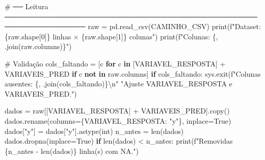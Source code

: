 \documentclass[
  letterpaper,
  DIV=11,
  numbers=noendperiod]{scrartcl}
\newenvironment{Shaded}{\begin{snugshade}}{\end{snugshade}}
\newcommand{\BuiltInTok}[1]{\textcolor[rgb]{0.00,0.23,0.31}{#1}}
\newcommand{\CharTok}[1]{\textcolor[rgb]{0.13,0.47,0.30}{#1}}
\newcommand{\CommentTok}[1]{\textcolor[rgb]{0.37,0.37,0.37}{#1}}
\newcommand{\ControlFlowTok}[1]{\textcolor[rgb]{0.00,0.23,0.31}{\textbf{#1}}}
\newcommand{\DecValTok}[1]{\textcolor[rgb]{0.68,0.00,0.00}{#1}}
\newcommand{\KeywordTok}[1]{\textcolor[rgb]{0.00,0.23,0.31}{\textbf{#1}}}
\newcommand{\NormalTok}[1]{\textcolor[rgb]{0.00,0.23,0.31}{#1}}
\newcommand{\OperatorTok}[1]{\textcolor[rgb]{0.37,0.37,0.37}{#1}}
\newcommand{\SpecialCharTok}[1]{\textcolor[rgb]{0.37,0.37,0.37}{#1}}
\newcommand{\SpecialStringTok}[1]{\textcolor[rgb]{0.13,0.47,0.30}{#1}}
\newcommand{\StringTok}[1]{\textcolor[rgb]{0.13,0.47,0.30}{#1}}
\newcommand{\VariableTok}[1]{\textcolor[rgb]{0.07,0.07,0.07}{#1}}
\begin{document}
\begin{Shaded}
\begin{Highlighting}[]
\CommentTok{\# ── Leitura ──────────────────────────────────────────────────────────────────}
\NormalTok{raw }\OperatorTok{=}\NormalTok{ pd.read\_csv(CAMINHO\_CSV)}
\BuiltInTok{print}\NormalTok{(}\SpecialStringTok{f"Dataset: }\SpecialCharTok{\{}\NormalTok{raw}\SpecialCharTok{.}\NormalTok{shape[}\DecValTok{0}\NormalTok{]}\SpecialCharTok{\}}\SpecialStringTok{ linhas × }\SpecialCharTok{\{}\NormalTok{raw}\SpecialCharTok{.}\NormalTok{shape[}\DecValTok{1}\NormalTok{]}\SpecialCharTok{\}}\SpecialStringTok{ colunas"}\NormalTok{)}
\BuiltInTok{print}\NormalTok{(}\SpecialStringTok{f"Colunas: }\SpecialCharTok{\{}\StringTok{\textquotesingle{}, \textquotesingle{}}\SpecialCharTok{.}\NormalTok{join(raw.columns)}\SpecialCharTok{\}}\SpecialStringTok{"}\NormalTok{)}

\CommentTok{\# Validação}
\NormalTok{cols\_faltando }\OperatorTok{=}\NormalTok{ [c }\ControlFlowTok{for}\NormalTok{ c }\KeywordTok{in}\NormalTok{ [VARIAVEL\_RESPOSTA] }\OperatorTok{+}\NormalTok{ VARIAVEIS\_PRED}
                 \ControlFlowTok{if}\NormalTok{ c }\KeywordTok{not} \KeywordTok{in}\NormalTok{ raw.columns]}
\ControlFlowTok{if}\NormalTok{ cols\_faltando:}
\NormalTok{    sys.exit(}\SpecialStringTok{f"Colunas ausentes: }\SpecialCharTok{\{}\StringTok{\textquotesingle{}, \textquotesingle{}}\SpecialCharTok{.}\NormalTok{join(cols\_faltando)}\SpecialCharTok{\}}\CharTok{\textbackslash{}n}\SpecialStringTok{"}
             \StringTok{"Ajuste VARIAVEL\_RESPOSTA e VARIAVEIS\_PRED."}\NormalTok{)}

\NormalTok{dados }\OperatorTok{=}\NormalTok{ raw[[VARIAVEL\_RESPOSTA] }\OperatorTok{+}\NormalTok{ VARIAVEIS\_PRED].copy()}
\NormalTok{dados.rename(columns}\OperatorTok{=}\NormalTok{\{VARIAVEL\_RESPOSTA: }\StringTok{"y"}\NormalTok{\}, inplace}\OperatorTok{=}\VariableTok{True}\NormalTok{)}
\NormalTok{dados[}\StringTok{"y"}\NormalTok{] }\OperatorTok{=}\NormalTok{ dados[}\StringTok{"y"}\NormalTok{].astype(}\BuiltInTok{int}\NormalTok{)}
\NormalTok{n\_antes }\OperatorTok{=} \BuiltInTok{len}\NormalTok{(dados)}
\NormalTok{dados.dropna(inplace}\OperatorTok{=}\VariableTok{True}\NormalTok{)}
\ControlFlowTok{if} \BuiltInTok{len}\NormalTok{(dados) }\OperatorTok{\textless{}}\NormalTok{ n\_antes:}
    \BuiltInTok{print}\NormalTok{(}\SpecialStringTok{f"Removidas }\SpecialCharTok{\{}\NormalTok{n\_antes }\OperatorTok{{-}} \BuiltInTok{len}\NormalTok{(dados)}\SpecialCharTok{\}}\SpecialStringTok{ linha(s) com NA."}\NormalTok{)}


\end{Highlighting}
\end{Shaded}
\end{document}
